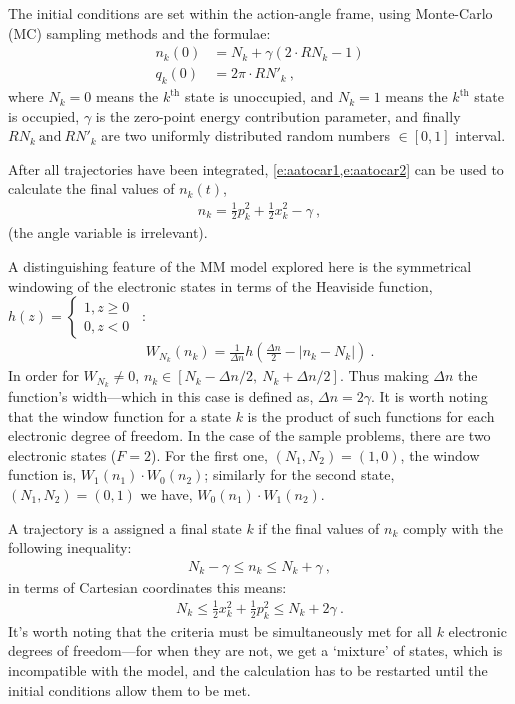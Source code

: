 The initial conditions are set within the action-angle frame, using Monte-Carlo (MC) sampling methods and the formulae:
\begin{subequations}
\begin{align}
n_{k}(0) &= N_{k} + \gamma (2 \cdot RN_{k} - 1)\\
q_{k}(0) &= 2\pi \cdot RN'_{k}~,
\end{align}
\end{subequations}
where $ N_{k} = 0$ means the $ k^{\text{th}} $ state is unoccupied, and $ N_{k} = 1 $ means the $ k^{\text{th}} $ state is occupied, $ \gamma $ is the zero-point energy contribution parameter, and finally $ RN_{k}~\text{and}~RN'_{k} $ are two uniformly distributed random numbers $ \in [0,1] $ interval.

After all trajectories have been integrated, \cref{e:aatocar1,e:aatocar2} can be used to calculate the final values of $ n_{k}(t) $,
\begin{align}\label{e:nk}
n_{k} = \frac{1}{2} p_{k}^{2} + \frac{1}{2} x_{k}^{2} - \gamma~,
\end{align}
(the angle variable is irrelevant).

A distinguishing feature of the MM model explored here is the symmetrical windowing of the electronic states in terms of the Heaviside function, $ h(z) = \begin{cases}1, z \ge 0\\ 0, z < 0 \end{cases}$~:
\begin{align}\label{e:window}
W_{N_{k}}(n_{k}) = \frac{1}{\Delta n} h\left(\frac{\Delta n}{2} - |n_{k}-N_{k}|\right)~.
\end{align}
In order for $ W_{N_{k}} \neq 0 $, $ n_{k} \in [N_{k} - \Delta n/2,~N_{k} + \Delta n/2]$. Thus making $ \Delta n $ the function's width---which in this case is defined as, $ \Delta n = 2\gamma $. It is worth noting that the window function for a state $ k $ is the product of such functions for each electronic degree of freedom. In the case of the sample problems, there are two electronic states ($ F = 2 $). For the first one, $( N_{1}, N_{2} ) = (1,0) $, the window function is, $ W_{1}(n_{1}) \cdot W_{0}(n_{2}) $; similarly for the second state, $ (N_{1}, N_{2}) = (0,1) $ we have, $ W_{0}(n_{1}) \cdot W_{1}(n_{2}) $.

A trajectory is a assigned a final state $ k $ if the final values of $ n_{k} $ comply with the following inequality:
\begin{align}
N_{k} - \gamma \le n_{k} \le N_{k} + \gamma~,
\end{align}
in terms of Cartesian coordinates this means:
\begin{align}\label{e:select}
N_{k} \le \frac{1}{2} x_{k}^{2} + \frac{1}{2} p_{k}^{2} \le N_{k} + 2\gamma~.
\end{align}
It's worth noting that the criteria must be simultaneously met for all $ k $ electronic degrees of freedom---for when they are not, we get a `mixture' of states, which is incompatible with the model, and the calculation has to be restarted until the initial conditions allow them to be met.

